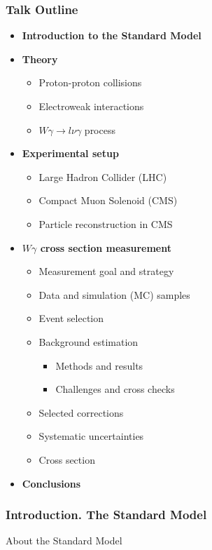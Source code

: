 \begin{frame}\frametitle{Talk Outline}
  \begin{itemize}
     \item {\scriptsize\bfseries{Introduction to the Standard Model}}
     \item {\scriptsize\bfseries{Theory}}
       \begin{itemize}
          \tiny
          \item Proton-proton collisions
          \item Electroweak interactions
          \item $W\gamma\rightarrow l\nu\gamma$ process
       \end{itemize}
     \item {\scriptsize\bfseries{Experimental setup}}
       \begin{itemize}
          \tiny
          \item Large Hadron Collider (LHC)
          \item Compact Muon Solenoid (CMS)
          \item Particle reconstruction in CMS
       \end{itemize}
     \item {\scriptsize\bfseries{$W\gamma$ cross section measurement}}
       \begin{itemize}
          \tiny
          \item Measurement goal and strategy 
          \item Data and simulation (MC) samples
          \item Event selection
          \item Background estimation
             \begin{itemize}
                \tiny
                \item Methods and results
                \item Challenges and cross checks 
             \end{itemize}
         \item Selected corrections
         \item Systematic uncertainties
         \item Cross section
       \end{itemize}
     \item {\scriptsize\bfseries{Conclusions}}
  \end{itemize}
\end{frame}%

\begin{frame}\frametitle{Introduction. The Standard Model}
\scriptsize
About the Standard Model
\end{frame}%

